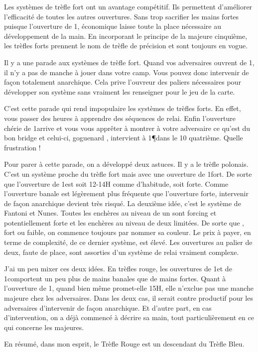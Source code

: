 Les systèmes de trèfle fort ont un avantage compétitif. Ils permettent d'améliorer l'efficacité de toutes les autres ouvertures. Sans trop sacrifier les mains fortes puisque l'ouverture de 1\T, économique laisse toute la place nécessaire au développement de la main. En incorporant le principe de la majeure cinquième, les trèfles forts prennent le nom de trèfle de précision et sont toujours en vogue.

Il y a une parade aux systèmes de trèfle fort. Quand vos adversaires ouvrent de 1\T, il n'y a pas de manche à jouer dans votre camp. Vous pouvez donc intervenir de façon totalement anarchique. Cela prive l'ouvreur des paliers nécessaires pour développer son système sans vraiment les renseigner pour le jeu de la carte.

C'est cette parade qui rend impopulaire les systèmes de trèfles forts. En effet, vous passer des heures à apprendre des séquences de relai. Enfin l'ouverture chérie de 1\T arrive et vous vous apprêter à montrer à votre adversaire ce qu'est du bon bridge et celui-ci, goguenard , intervient à 1\P dans le 10 quatrième. Quelle frustration !

Pour parer à cette parade, on a développé deux astuces. Il y a le trèfle polonais. C'est un système proche du trèfle fort mais avec une ouverture de 1\NT fort. De sorte que l'ouverture de 1\T est soit 12-14H comme d'habitude, soit forte. Comme l'ouverture banale est légèrement plus fréquente que l'ouverture forte, intervenir de façon anarchique devient très risqué. La deuxième idée, c'est le système de Fantoni et Nunes. Toutes les enchères au niveau de un sont forcing et potentiellement forte et les enchères au niveau de deux limitées. De sorte que , fort ou faible, on commence toujours par nommer sa couleur.
Le prix à payer, en terme de complexité, de ce dernier système, est élevé. Les ouvertures au palier de deux, faute de place, sont assorties d'un système de relai vraiment complexe.

J'ai un peu mixer ces deux idées. En trèfles rouge, les ouvertures de 1\T et de 1\K comportent un peu plus de mains banales que de mains fortes. Quant à l'ouverture de 1\C, quand bien même promet-elle 15H, elle n'exclue pas une manche majeure chez les adversaires. Dans les deux cas, il serait contre productif pour les adversaires d'intervenir de façon anarchique. Et d'autre part, en cas d'intervention, on a déjà commencé à décrire sa main, tout particulièrement en ce qui concerne les majeures.

En résumé, dans mon esprit, le Trèfle Rouge est un descendant du Trèfle Bleu.













